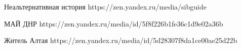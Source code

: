  
 
 
 
 

Неальтернативная история
https://zen.yandex.ru/media/sibguide

МАЙ ДНР
https://zen.yandex.ru/media/id/5f8f226b1fe36c1d9e02a36b

Житель Алтая
https://zen.yandex.ru/media/id/5d28307f8da1ce00ae25d22b

